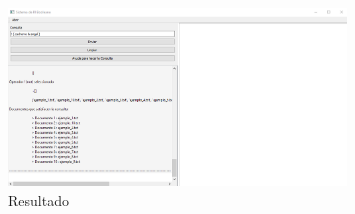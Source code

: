 \begin{itemize}
  \begin{figure}[ht]
    \centering
    \includegraphics[width=0.8\textwidth]{src/img/resultado/6.png}
    \caption{Resultado}
  \end{figure}
\end{itemize}

